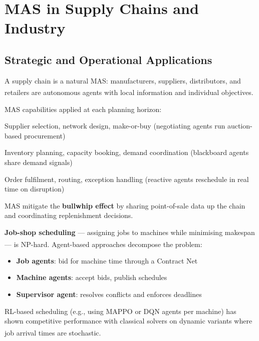 \section{MAS in Supply Chains and Industry}

\subsection{Strategic and Operational Applications}
\begin{tcbitemize}[ skin=sectionraster ]

    \tcbitem[title=Supply Chain Coordination, raster multicolumn=3]
    A supply chain is a natural MAS: manufacturers, suppliers, distributors, and
    retailers are autonomous agents with local information and individual
    objectives.\textsuperscript{\cite[][p.~22]{chopraSupplyChainManagement2019}}

    MAS capabilities applied at each planning horizon:
    \begin{description}[leftmargin=0.6cm, labelindent=0pt]
        \item[\textbf{Strategic}] Supplier selection, network design, make-or-buy
              (negotiating agents run auction-based procurement)
        \item[\textbf{Tactical}] Inventory planning, capacity booking, demand
              coordination (blackboard agents share demand signals)
        \item[\textbf{Operational}] Order fulfilment, routing, exception handling
              (reactive agents reschedule in real time on disruption)
    \end{description}
    MAS mitigate the \textbf{bullwhip effect} by sharing point-of-sale data
    up the chain and coordinating replenishment decisions.

    \tcbitem[title=Production Scheduling, raster multicolumn=3]
    \textbf{Job-shop scheduling} --- assigning jobs to machines while minimising
    makespan --- is NP-hard. Agent-based approaches decompose the problem:
    \textsuperscript{\cite[][p.~4]{paolucciAgentBasedManufacturing2005}}
    \begin{itemize}
        \item \textbf{Job agents}: bid for machine time through a Contract Net
        \item \textbf{Machine agents}: accept bids, publish schedules
        \item \textbf{Supervisor agent}: resolves conflicts and enforces deadlines
    \end{itemize}
    RL-based scheduling (e.g., using MAPPO or DQN agents per machine) has shown
    competitive performance with classical solvers on dynamic variants where
    job arrival times are
    stochastic.\textsuperscript{\cite{panJobShopSchedulingRL2021}}

\end{tcbitemize}

